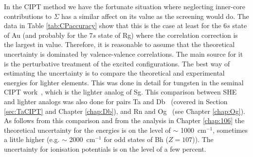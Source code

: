\documentclass[10pt,a4paper, twoside, openright]{report}
\begin{document}
\linebreak   
In the CIPT method we have the fortunate situation where neglecting inner-core contributions to $\Sigma$ has a similar affect on its value as the screening would do.  The data in Table \ref{tab:CPaccuracy} show that this is the case at least for the
$6s$ state of Au (and probably for the $7s$ state of Rg) where the correlation correction
is the largest in value. Therefore, it is reasonable to assume that the theoretical uncertainty is dominated by valence-valence correlations. The main source for it is the perturbative treatment of the excited configurations. The best way of estimating the uncertainty is to compare the theoretical and experimental energies for lighter elements. This was done in detail for tungsten in the seminal CIPT work~\cite{DBHF2017}, which is the lighter analog of Sg.  This comparison between SHE and lighter analogs was also done for pairs Ta and Db~\cite{LDFDb2018} (covered in Section \ref{sec:TaCIPT} and Chapter \ref{chap:Db}), and Rn and Og~\cite{LDFOg2018} (see Chapter \ref{chap:Og}). As follows from this comparison and from the analysis in Chapter \ref{chap:106} the theoretical uncertainty for the energies is on the level of $\sim$ 1000~cm$^{-1}$, sometimes a little higher (e.g.  $\sim$ 2000~cm$^{-1}$ for odd states of Bh ($Z=107$)). The uncertainty for ionisation potentials is on the level of a few percent.
\end{document}
